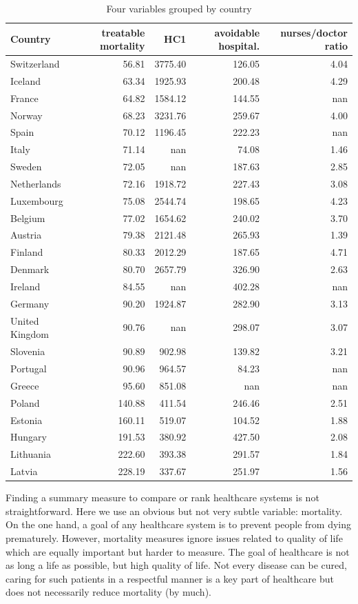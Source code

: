 \documentclass[12pt,english,a4paper]{article}
\begin{document}
\begin{table}[htbp]
\caption{\label{tab:org081e4c3}Four variables grouped by country}
\centering
\begin{tabular}{lrrrr}
Country & treatable mortality & HC1 & avoidable hospital. & nurses/doctor ratio\\
\hline
Switzerland & 56.81 & 3775.40 & 126.05 & 4.04\\
Iceland & 63.34 & 1925.93 & 200.48 & 4.29\\
France & 64.82 & 1584.12 & 144.55 & nan\\
Norway & 68.23 & 3231.76 & 259.67 & 4.00\\
Spain & 70.12 & 1196.45 & 222.23 & nan\\
Italy & 71.14 & nan & 74.08 & 1.46\\
Sweden & 72.05 & nan & 187.63 & 2.85\\
Netherlands & 72.16 & 1918.72 & 227.43 & 3.08\\
Luxembourg & 75.08 & 2544.74 & 198.65 & 4.23\\
Belgium & 77.02 & 1654.62 & 240.02 & 3.70\\
Austria & 79.38 & 2121.48 & 265.93 & 1.39\\
Finland & 80.33 & 2012.29 & 187.65 & 4.71\\
Denmark & 80.70 & 2657.79 & 326.90 & 2.63\\
Ireland & 84.55 & nan & 402.28 & nan\\
Germany & 90.20 & 1924.87 & 282.90 & 3.13\\
United Kingdom & 90.76 & nan & 298.07 & 3.07\\
Slovenia & 90.89 & 902.98 & 139.82 & 3.21\\
Portugal & 90.96 & 964.57 & 84.23 & nan\\
Greece & 95.60 & 851.08 & nan & nan\\
Poland & 140.88 & 411.54 & 246.46 & 2.51\\
Estonia & 160.11 & 519.07 & 104.52 & 1.88\\
Hungary & 191.53 & 380.92 & 427.50 & 2.08\\
Lithuania & 222.60 & 393.38 & 291.57 & 1.84\\
Latvia & 228.19 & 337.67 & 251.97 & 1.56\\
\end{tabular}
\end{table}

Finding a summary measure to compare or rank healthcare systems is not straightforward. Here we use an obvious but not very subtle variable: mortality. On the one hand, a goal of any healthcare system is to prevent people from dying prematurely. However, mortality measures ignore issues related to quality of life which are equally important but harder to measure. The goal of healthcare is not as long a life as possible, but high quality of life. Not every disease can be cured, caring for such patients in a respectful manner is a key part of healthcare but does not necessarily reduce mortality (by much).
\end{document}
